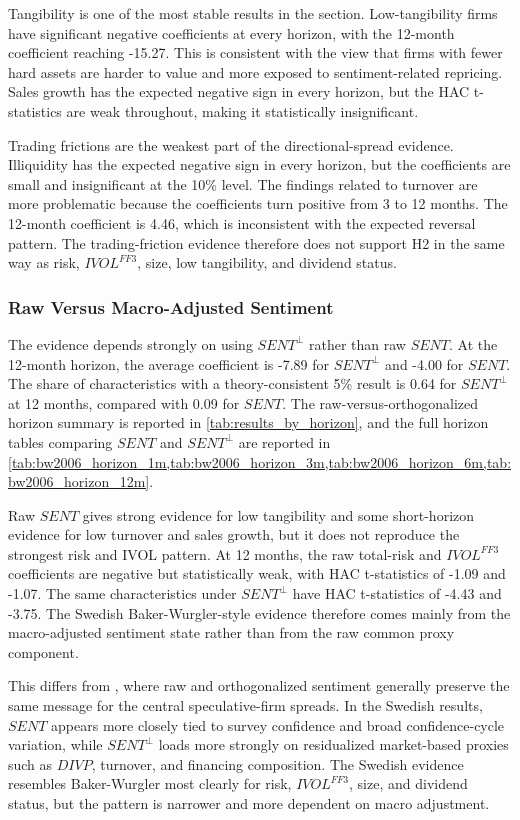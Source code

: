 \documentclass[11pt]{article}
\newcommand{\var}[1]{\ensuremath{#1}}
\begin{document}
Tangibility is one of the most stable results in the section. Low-tangibility firms have significant negative coefficients at every horizon, with the 12-month coefficient reaching -15.27. This is consistent with the view that firms with fewer hard assets are harder to value and more exposed to sentiment-related repricing. Sales growth has the expected negative sign in every horizon, but the HAC t-statistics are weak throughout, making it statistically insignificant.

Trading frictions are the weakest part of the directional-spread evidence. Illiquidity has the expected negative sign in every horizon, but the coefficients are small and insignificant at the 10\% level. The findings related to turnover are more problematic because the coefficients turn positive from 3 to 12 months. The 12-month coefficient is 4.46, which is inconsistent with the expected reversal pattern. The trading-friction evidence therefore does not support H2 in the same way as risk, \var{IVOL^{FF3}}, size, low tangibility, and dividend status.

\subsubsection{Raw Versus Macro-Adjusted Sentiment}
The evidence depends strongly on using \var{SENT^{\perp}} rather than raw \var{SENT}. At the 12-month horizon, the average coefficient is -7.89 for \var{SENT^{\perp}} and -4.00 for \var{SENT}. The share of characteristics with a theory-consistent 5\% result is 0.64 for \var{SENT^{\perp}} at 12 months, compared with 0.09 for \var{SENT}. The raw-versus-orthogonalized horizon summary is reported in \cref{tab:results_by_horizon}, and the full horizon tables comparing \var{SENT} and \var{SENT^{\perp}} are reported in \cref{tab:bw2006_horizon_1m,tab:bw2006_horizon_3m,tab:bw2006_horizon_6m,tab:bw2006_horizon_12m}.

Raw \var{SENT} gives strong evidence for low tangibility and some short-horizon evidence for low turnover and sales growth, but it does not reproduce the strongest risk and IVOL pattern. At 12 months, the raw total-risk and \var{IVOL^{FF3}} coefficients are negative but statistically weak, with HAC t-statistics of -1.09 and -1.07. The same characteristics under \var{SENT^{\perp}} have HAC t-statistics of -4.43 and -3.75. The Swedish Baker-Wurgler-style evidence therefore comes mainly from the macro-adjusted sentiment state rather than from the raw common proxy component.

This differs from \citet{baker2006sentiment}, where raw and orthogonalized sentiment generally preserve the same message for the central speculative-firm spreads. In the Swedish results, \var{SENT} appears more closely tied to survey confidence and broad confidence-cycle variation, while \var{SENT^{\perp}} loads more strongly on residualized market-based proxies such as \var{DIVP}, turnover, and financing composition. The Swedish evidence resembles Baker-Wurgler most clearly for risk, \var{IVOL^{FF3}}, size, and dividend status, but the pattern is narrower and more dependent on macro adjustment.
\end{document}
